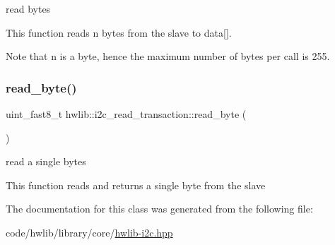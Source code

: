 read bytes

This function reads n bytes from the slave to data\mbox{[}\mbox{]}.

Note that n is a byte, hence the maximum number of bytes per call is 255. \mbox{\label{classhwlib_1_1i2c__read__transaction_a404a7d9db0ddd18aaeac84b266e89f9e}} 
\subsubsection{\texorpdfstring{read\+\_\+byte()}{read\_byte()}}
{\footnotesize\ttfamily uint\+\_\+fast8\+\_\+t hwlib\+::i2c\+\_\+read\+\_\+transaction\+::read\+\_\+byte (\begin{DoxyParamCaption}{ }\end{DoxyParamCaption})\hspace{0.3cm}{\ttfamily [inline]}}

read a single bytes

This function reads and returns a single byte from the slave 

The documentation for this class was generated from the following file\+:\begin{DoxyCompactItemize}
\item 
code/hwlib/library/core/\hyperlink{hwlib-i2c_8hpp}{hwlib-\/i2c.\+hpp}\end{DoxyCompactItemize}
